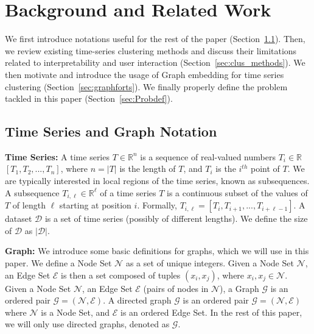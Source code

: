 \section{Background and Related Work}
\label{sec:background}

We first introduce
notations useful for the rest of the paper (Section~\ref{sec:notation}). Then, we review
existing time-series clustering methods and discuss their limitations related to interpretability and user interaction (Section~\ref{sec:clus_methods}). We then motivate and introduce the usage of Graph embedding for time series clustering (Section~\ref{sec:graphforts}). We finally properly define the problem tackled in this paper (Section~\ref{sec:Probdef}).

\subsection{Time Series and Graph Notation}
\label{sec:notation}

\textbf{Time Series: }A  time series $T \in \mathbb{R}^n $ is a sequence of real-valued numbers $T_i\in\mathbb{R}$ $[T_1,T_2,...,T_n]$, where $n=|T|$ is the length of $T$, and $T_i$ is the $i^{th}$ point of $T$.  We are typically interested in local regions of the time series, known as subsequences. A subsequence $T_{i,\ell} \in \mathbb{R}^\ell$ of a time series $T$ is a continuous subset of the values of $T$ of length $\ell$ starting at position $i$. Formally, $T_{i,\ell} = [T_i, T_{i+1},...,T_{i+\ell-1}]$.
A dataset $\mathcal{D}$ is a set of time series (possibly of different lengths). 
We define the size of $\mathcal{D}$ as $|\mathcal{D}|$.

\noindent \textbf{Graph: }
We introduce some basic definitions for graphs, which we will use in this paper.
We define a Node Set $\mathcal{N}$ as a set of unique integers.
Given a Node Set $\mathcal{N}$, an Edge Set $\mathcal{E}$ is then a set composed of tuples $(x_i,x_j)$, where $x_i,x_j \in \mathcal{N}$. 
Given a Node Set $\mathcal{N}$, an Edge Set $\mathcal{E}$ (pairs of nodes in $\mathcal{N}$), a Graph $\mathcal{G}$ is an ordered pair $\mathcal{G}=(\mathcal{N},\mathcal{E})$.
A directed graph $\mathcal{G}$ is an ordered pair $\mathcal{G}=(\mathcal{N},\mathcal{E})$ where $\mathcal{N}$ is a Node Set, and $\mathcal{E}$ is an ordered Edge Set.
In the rest of this paper, we will only use directed graphs, denoted as $\mathcal{G}$.

